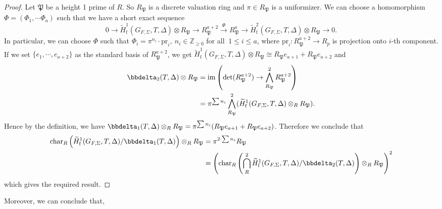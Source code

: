 \documentclass[10pt]{amsart}
\numberwithin{equation}{section}
\theoremstyle{definition}
\theoremstyle{remark} %
\newcommand{\Z}{\mathbb{Z}}
\begin{document}
		\begin{proof}
			Let $\mathfrak{P}$ be a height 1 prime of $ R $. So $ R_\mathfrak{P} $ is a discrete valuation ring and $ \pi \in R_\mathfrak{P} $ is a uniformizer. We can choose a homomorphism $ \varPhi = (\varPhi_1, \cdots \varPhi_a) $ such that we have a short exact sequence 
			$$ 0 \rightarrow \widetilde{H}^1_{\mathrm{f}}(G_{F,\Sigma},T,\Delta) \otimes R_\mathfrak{P} \rightarrow R_\mathfrak{P}^{a+2} \xrightarrow{\varPhi} R_\mathfrak{P}^{a} \rightarrow \widetilde{H}^2_{\mathrm{f}}(G_{F,\Sigma},T,\Delta) \otimes R_\mathfrak{P} \rightarrow 0 .$$
			In particular, we can choose $ \varPhi $ such that $ \varPhi_i = \pi^{n_i}\cdot \mathrm{pr}_i,\: n_i \in \Z_{\ge0}$ for all $ \: 1 \le i \le a $, where $\mathrm{pr}_i \colon R_\mathfrak{P}^{a+2} \rightarrow R_p$ is projection onto $ i$-th component. If we set $\{ e_1, \cdots, e_{a+2}\}$ as the standard basis of $R_\mathfrak{P}^{a+2} $, we get $\widetilde{H}^1_{\mathrm{f}}(G_{F,\Sigma},T,\Delta) \otimes R_\mathfrak{P} \cong R_\mathfrak{P} e_{a+1} + R_\mathfrak{P} e_{a+2}$ and 
			\begin{equation*}
				\begin{split}
					\bbdelta_2(T,\Delta) \otimes R_\mathfrak{P} &= \mathrm{im}\left(\det(R_\mathfrak{P}^{a+2}) \rightarrow \bigwedge_{R_\mathfrak{P}}^2 R_\mathfrak{P}^{a+2}\right) \\
					&= \pi^{\sum n_i} \bigwedge_{R_\mathfrak{P}}^2(\widetilde{H}^1_{\mathrm{f}}(G_{F,\Sigma},T,\Delta) \otimes_R R_\mathfrak{P}).
				\end{split}
			\end{equation*}   
			Hence by the definition, we have $ \bbdelta_1(T,\Delta) \otimes_R R_\mathfrak{P} = \pi^{\sum n_i}(R_\mathfrak{P} e_{a+1} + R_\mathfrak{P} e_{a+2}) $. Therefore we conclude that 
			\begin{equation*}
				\begin{split}
					\mathrm{char}_R\left(\widetilde{H}^1_{\mathrm{f}}(G_{F,\Sigma},T,\Delta)/\bbdelta_1(T,\Delta)\right) \otimes_R R_\mathfrak{P} &= \pi^{2 \cdot \sum n_i} R_\mathfrak{P} \\
					&=\left(\mathrm{char}_R\left(\bigcap^2_R\widetilde{H}^1_{\mathrm{f}}(G_{F,\Sigma},T,\Delta)/\bbdelta_2(T,\Delta)\right) \otimes_R R_\mathfrak{P}\right)^2 \\
				\end{split}
			\end{equation*}
			which gives the required result.
		\end{proof}
		Moreover, we can conclude that,
\end{document}
